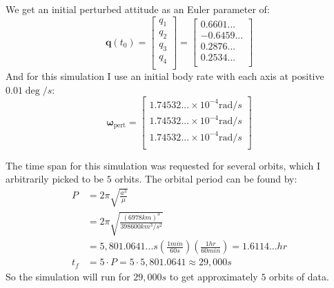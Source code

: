 \documentclass[titlepage]{article}
\begin{document}
\begin{mdframed}[linewidth=1pt, innertopmargin=10pt, innerbottommargin=10pt]
	We get an initial perturbed attitude as an Euler parameter of:
	\begin{equation}
		\boldsymbol{q}(t_0)=
		\begin{bmatrix}
			q_1 \\ q_2 \\ q_3 \\ q_4 \\
		\end{bmatrix}=
		\begin{bmatrix}
			0.6601... \\ -0.6459... \\ 0.2876... \\ 0.2534... \\
		\end{bmatrix}
	\end{equation}
	And for this simulation I use an initial body rate with each axis at positive $0.01\deg/s$:
	\begin{equation}
		\boldsymbol{\omega}_{\text{pert}}=
		\begin{bmatrix}
			1.74532...\times10^{-4}\text{rad}/s \\
			1.74532...\times10^{-4}\text{rad}/s \\
			1.74532...\times10^{-4}\text{rad}/s \\
		\end{bmatrix}
	\end{equation}
\end{mdframed}

The time span for this simulation was requested for several orbits, which I arbitrarily picked to be $5$ orbits. The orbital period can be found by:
\begin{equation}
	\begin{split}
		P&=2\pi\sqrt{\frac{a^3}{\mu}}\\
		&=2\pi\sqrt{\frac{(6978km)^3}{398600km^3/s^2}}\\
		&=5,801.0641...s\left(\frac{1min}{60s}\right)\left(\frac{1hr}{60min}\right)=1.6114...hr
		\\
		t_f&=5\cdot P=5\cdot5,801.0641\approx29,000s
	\end{split}
\end{equation}
So the simulation will run for $29,000s$ to get approximately $5$ orbits of data.\\
\end{document}
